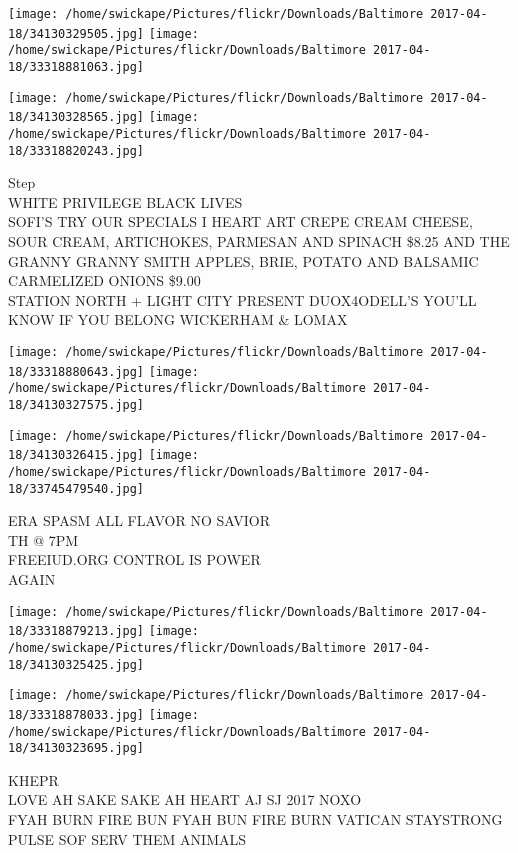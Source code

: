 \documentclass[10pt,letterpaper]{article}
\begin{document}
\texttt{[image: /home/swickape/Pictures/flickr/Downloads/Baltimore 2017-04-18/34130329505.jpg]}
\texttt{[image: /home/swickape/Pictures/flickr/Downloads/Baltimore 2017-04-18/33318881063.jpg]}

\texttt{[image: /home/swickape/Pictures/flickr/Downloads/Baltimore 2017-04-18/34130328565.jpg]}
\texttt{[image: /home/swickape/Pictures/flickr/Downloads/Baltimore 2017-04-18/33318820243.jpg]}

Step\\
WHITE PRIVILEGE BLACK LIVES\\
SOFI'S TRY OUR SPECIALS I HEART ART CREPE CREAM CHEESE, SOUR CREAM, ARTICHOKES, PARMESAN AND SPINACH \$8.25 AND THE GRANNY GRANNY SMITH APPLES, BRIE, POTATO AND BALSAMIC CARMELIZED ONIONS \$9.00\\
STATION NORTH + LIGHT CITY PRESENT DUOX4ODELL'S YOU'LL KNOW IF YOU BELONG WICKERHAM \& LOMAX\\
\pagebreak

\texttt{[image: /home/swickape/Pictures/flickr/Downloads/Baltimore 2017-04-18/33318880643.jpg]}
\texttt{[image: /home/swickape/Pictures/flickr/Downloads/Baltimore 2017-04-18/34130327575.jpg]}

\texttt{[image: /home/swickape/Pictures/flickr/Downloads/Baltimore 2017-04-18/34130326415.jpg]}
\texttt{[image: /home/swickape/Pictures/flickr/Downloads/Baltimore 2017-04-18/33745479540.jpg]}

ERA SPASM ALL FLAVOR NO SAVIOR\\
TH @ 7PM\\
FREEIUD.ORG CONTROL IS POWER\\
AGAIN\\
\pagebreak

\texttt{[image: /home/swickape/Pictures/flickr/Downloads/Baltimore 2017-04-18/33318879213.jpg]}
\texttt{[image: /home/swickape/Pictures/flickr/Downloads/Baltimore 2017-04-18/34130325425.jpg]}

\texttt{[image: /home/swickape/Pictures/flickr/Downloads/Baltimore 2017-04-18/33318878033.jpg]}
\texttt{[image: /home/swickape/Pictures/flickr/Downloads/Baltimore 2017-04-18/34130323695.jpg]}

KHEPR\\
LOVE AH SAKE SAKE AH HEART AJ SJ 2017 NOXO\\
FYAH BURN FIRE BUN FYAH BUN FIRE BURN VATICAN STAYSTRONG\\
PULSE SOF SERV THEM ANIMALS\\
\pagebreak
\end{document}
